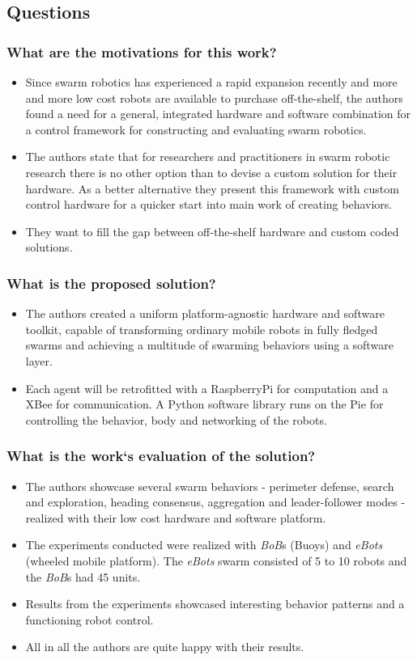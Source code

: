 \subsection*{Questions}
\subsubsection*{What are the motivations for this work?}
\begin{itemize}
    \item Since swarm robotics has experienced a rapid expansion recently and more and more low cost robots are available to purchase off-the-shelf, the authors found a need for a general, integrated hardware and software combination for a control framework for constructing and evaluating swarm robotics.
    \item The authors state that for researchers and practitioners in swarm robotic research there is no other option than to devise a custom solution for their hardware. As a better alternative they present this framework with custom control hardware for a quicker start into main work of creating behaviors.
    \item They want to fill the gap between off-the-shelf hardware and custom coded solutions.
\end{itemize}
\subsubsection*{What is the proposed solution?}
\begin{itemize}
    \item The authors created a uniform platform-agnostic hardware and software toolkit, capable of transforming ordinary mobile robots in fully fledged swarms and achieving a multitude of swarming behaviors using a software layer.
    \item Each agent will be retrofitted with a RaspberryPi for computation and a XBee for communication. A Python software library runs on the Pie for controlling the behavior, body and networking of the robots.
\end{itemize}
\subsubsection*{What is the work`s evaluation of the solution?}
\begin{itemize}
    \item The authors showcase several swarm behaviors - perimeter defense, search and exploration, heading consensus, aggregation and leader-follower modes - realized with their low cost hardware and software platform.
    \item The experiments conducted were realized with \emph{BoB}s (Buoys) and \emph{eBots} (wheeled mobile platform). The \emph{eBots} swarm consisted of 5 to 10 robots and the \emph{BoB}s  had 45 units. 
    \item Results from the experiments showcased interesting behavior patterns and a functioning robot control.
    \item All in all the authors are quite happy with their results.
\end{itemize}
